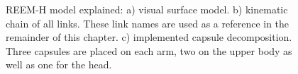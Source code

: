 \begin{figure}[h!]
  \centering
\caption{REEM-H model explained: a) visual surface model. b) kinematic chain of all links. These link names are used as a reference in the remainder of this chapter. c) implemented capsule decomposition. Three capsules are placed on each arm, two on the upper body as well as one for the head.}
    \label{fig:reemmodels}
\end{figure}
